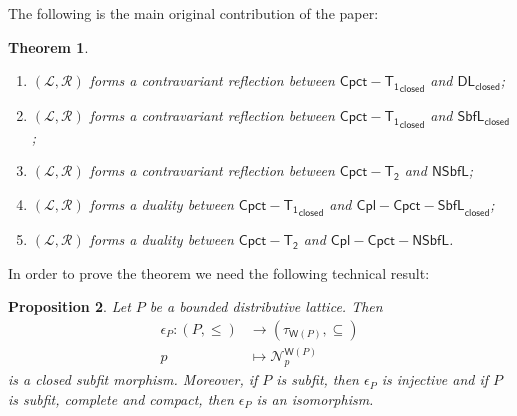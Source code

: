 \documentclass{article}
\newcommand{\opencorn}[2]{\mathcal{N}^{\mathsf{W}(#1)}_{#2}}
\theoremstyle{plain}
\newtheorem{theorem}{Theorem}[subsection]
\newtheorem{proposition}[theorem]{Proposition}
\theoremstyle{definition}
\theoremstyle{remark}
\newcommand{\bool}[1]{\mathsf{#1}}
\newcommand{\0}{\mathbbm 0}
\newcommand{\1}{\mathbbm 1}
\newcommand{\2}{\mathbbm 2}
\begin{document}
The following is the main original contribution of the paper:


\begin{theorem}
\label{thm:adj-dual} $ $
\begin{enumerate}
\item \label{thm:adj-dual-0}
    $(\mathcal{L}, \mathcal{R})$ forms a contravariant reflection between $\bool{Cpct-T_1}_\bool{closed}$ and $\bool{DL}_\bool{closed}$; 
    \item \label{thm:adj-dual-1}
    $(\mathcal{L}, \mathcal{R})$ forms a contravariant reflection between $\bool{Cpct-T_1}_\bool{closed}$ and $\bool{SbfL}_\bool{closed}$; 
        \item \label{thm:adj-dual-2} $(\mathcal{L}, \mathcal{R})$ forms a contravariant reflection between $\bool{Cpct-T_2}$ and $\bool{NSbfL}$; 
            \item  \label{thm:adj-dual-3} $(\mathcal{L}, \mathcal{R})$ forms a duality between $\bool{Cpct-T_1}_\bool{closed}$ and $\bool{Cpl-Cpct-SbfL}_\bool{closed} $;
                    \item \label{thm:adj-dual-4} $(\mathcal{L}, \mathcal{R})$ forms a duality between $\bool{Cpct-T_2}$ and $\bool{Cpl-Cpct-NSbfL}$.
\end{enumerate}
\end{theorem}









In order to prove the theorem we need the following technical result:






\begin{proposition}
    \label{prop:counit}
    Let $P$ be a bounded distributive lattice. Then \begin{align*}
    \epsilon_P:(P, \leq) &\to (\tau_{\mathsf{W}(P)}, \subseteq)  \\
    p &\mapsto \opencorn{P}{p}
\end{align*}
is a closed subfit morphism. Moreover, if $P$ is subfit, then $\epsilon_P$ is injective and if $P$ is  subfit, complete  and compact, then $\epsilon_P$ is an isomorphism. 
\end{proposition}
\end{document}
